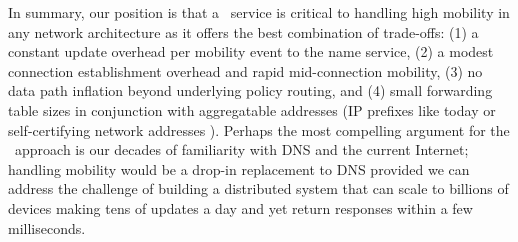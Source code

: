 


In {summary}, our position is that a \logcen\ service is critical to handling high mobility in any network architecture as it offers the best combination of trade-offs: (1) a constant update overhead per mobility event to the name service, (2) a modest connection establishment overhead and rapid mid-connection mobility, (3) no data path inflation beyond underlying policy routing, and (4) small forwarding table sizes in conjunction with aggregatable addresses (IP prefixes like today or self-certifying network addresses \cite{MobilityFirst-UMASS,XIA}). Perhaps the most compelling argument for the \logcen\ approach is our decades of familiarity with DNS and the current Internet; handling mobility would be a drop-in replacement to DNS provided we can address the challenge of building a distributed system that can scale to billions of devices making tens of updates a day and yet return responses within a few milliseconds. %
 
